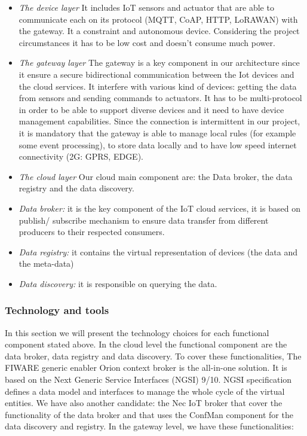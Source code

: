 \begin{itemize}
  \item \emph{The device layer}
    It includes IoT sensors and actuator that are able to communicate each on its protocol (MQTT, CoAP, HTTP, LoRAWAN) with the gateway. 
It a constraint and autonomous device. 
Considering the project circumstances it has to be low cost and doesn’t consume much power.
  \item \emph{The gateway layer}
  The gateway is a key component in our architecture since it ensure a secure bidirectional communication between the Iot devices and the cloud services.
 It interfere with various kind of devices: getting the data from sensors and sending commands to actuators.
  It has to be multi-protocol in order to be able to support diverse devices and it need to have device management capabilities.
Since the connection is intermittent in our project, it is mandatory that the gateway is able to manage local rules (for example some event processing), to store data locally and to have low speed internet connectivity (2G: GPRS, EDGE).
  \item \emph{The cloud layer}
  Our cloud main component are: the Data broker, the data registry and the data discovery.
  \item \emph{Data broker:}
    it is the key component of the IoT cloud services, it is based on publish/ subscribe mechanism to ensure data transfer from different producers to their respected consumers.
  \item \emph{Data registry:}
    it contains the virtual representation of devices (the data and the meta-data)
  \item \emph{Data discovery:} 
    it is responsible on querying the data.
\end{itemize}


\subsubsection{Technology and tools}

In this section we will present the technology choices for each functional component stated above.
In the cloud level the functional component are the data broker, data registry and data discovery.
To cover these functionalities, The FIWARE generic enabler Orion context broker is the all-in-one solution.
It is based on the Next Generic Service Interfaces (NGSI) 9/10.
NGSI specification defines a data model and interfaces to manage the whole cycle of the virtual entities.  
We have also another candidate: the Nec IoT broker that cover the functionality of the data broker and that uses the ConfMan component for the data discovery and registry.
In the gateway level, we have these functionalities:

